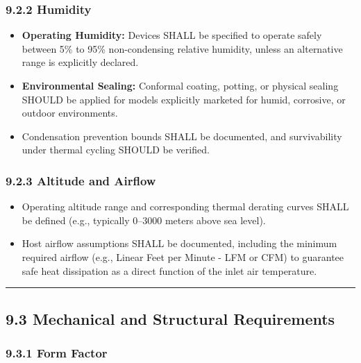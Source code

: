 \subsubsection{9.2.2 Humidity}\label{humidity}

\begin{itemize}
\tightlist
\item
  \textbf{Operating Humidity:} Devices SHALL be specified to operate
  safely between 5\% to 95\% non-condensing relative humidity, unless an
  alternative range is explicitly declared.\\
\item
  \textbf{Environmental Sealing:} Conformal coating, potting, or
  physical sealing SHOULD be applied for models explicitly marketed for
  humid, corrosive, or outdoor environments.\\
\item
  Condensation prevention bounds SHALL be documented, and survivability
  under thermal cycling SHOULD be verified.
\end{itemize}

\subsubsection{9.2.3 Altitude and Airflow}\label{altitude-and-airflow}

\begin{itemize}
\tightlist
\item
  Operating altitude range and corresponding thermal derating curves
  SHALL be defined (e.g., typically 0--3000 meters above sea level).\\
\item
  Host airflow assumptions SHALL be documented, including the minimum
  required airflow (e.g., Linear Feet per Minute - LFM or CFM) to
  guarantee safe heat dissipation as a direct function of the inlet air
  temperature.
\end{itemize}

\begin{center}\rule{0.5\linewidth}{0.5pt}\end{center}

\subsection{9.3 Mechanical and Structural
Requirements}\label{mechanical-and-structural-requirements}

\subsubsection{9.3.1 Form Factor}\label{form-factor}


